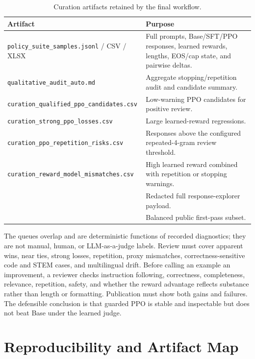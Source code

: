 \documentclass[11pt]{article}
\begin{document}
\begin{table}[H]
\centering
\small
\caption{Curation artifacts retained by the final workflow.}
\begin{tabularx}{\textwidth}{@{}p{}Y@{}}
\toprule
\textbf{Artifact} & \textbf{Purpose}\\
\midrule
\texttt{policy\_suite\_samples.jsonl} / CSV / XLSX & Full prompts,
Base/SFT/PPO responses, learned rewards, lengths, EOS/cap state, and pairwise
deltas.\\
\texttt{qualitative\_audit\_auto.md} & Aggregate stopping/repetition audit and
candidate summary.\\
\texttt{curation\_qualified\_ppo\_candidates.csv} & Low-warning PPO candidates
for positive review.\\
\texttt{curation\_strong\_ppo\_losses.csv} & Large learned-reward regressions.\\
\texttt{curation\_ppo\_repetition\_risks.csv} & Responses above the configured
repeated-4-gram review threshold.\\
\texttt{curation\_reward\_model\_mismatches.csv} & High learned reward combined
with repetition or stopping warnings.\\
 & Redacted full
response-explorer payload.\\
 & Balanced public
first-pass subset.\\
\bottomrule
\end{tabularx}
\end{table}

The queues overlap and are deterministic functions of recorded diagnostics;
they are not manual, human, or LLM-as-a-judge labels. Review must cover apparent
wins, near ties, strong losses, repetition, proxy mismatches, correctness-sensitive
code and STEM cases, and multilingual drift. Before calling an example an
improvement, a reviewer checks instruction following, correctness, completeness,
relevance, repetition, safety, and whether the reward advantage reflects
substance rather than length or formatting. Publication must show both gains
and failures. The defensible conclusion is that guarded PPO is stable and
inspectable but does not beat Base under the learned judge.

\section{Reproducibility and Artifact Map}
\end{document}
